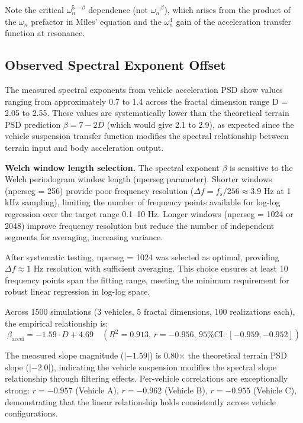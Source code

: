 \documentclass[11pt]{article}
\begin{document}
Note the critical $\omega_n^{5-\beta}$ dependence (not $\omega_n^{-\beta}$), which arises from the product of the $\omega_n$ prefactor in Miles' equation and the $\omega_n^4$ gain of the acceleration transfer function at resonance.


\subsection{Observed Spectral Exponent Offset}

The measured spectral exponents from vehicle acceleration PSD show values ranging from approximately 0.7 to 1.4 across the fractal dimension range D = 2.05 to 2.55. These values are systematically lower than the theoretical terrain PSD prediction $\beta = 7-2D$ (which would give 2.1 to 2.9), as expected since the vehicle suspension transfer function modifies the spectral relationship between terrain input and body acceleration output.

\textbf{Welch window length selection.} The spectral exponent $\beta$ is sensitive to the Welch periodogram window length (nperseg parameter). Shorter windows (nperseg = 256) provide poor frequency resolution ($\Delta f = f_s/256 \approx 3.9$ Hz at 1 kHz sampling), limiting the number of frequency points available for log-log regression over the target range 0.1--10 Hz. Longer windows (nperseg = 1024 or 2048) improve frequency resolution but reduce the number of independent segments for averaging, increasing variance. 

After systematic testing, nperseg = 1024 was selected as optimal, providing $\Delta f \approx 1$ Hz resolution with sufficient averaging. This choice ensures at least 10 frequency points span the fitting range, meeting the minimum requirement for robust linear regression in log-log space.

Across 1500 simulations (3 vehicles, 5 fractal dimensions, 100 realizations each), the empirical relationship is:
\begin{equation}
\beta_{\text{accel}} = -1.59 \cdot D + 4.69 \quad (R^2 = 0.913, \, r = -0.956, \, \text{95\% CI: } [-0.959, -0.952])
\end{equation}

The measured slope magnitude ($|-1.59|$) is 0.80$\times$ the theoretical terrain PSD slope ($|-2.0|$), indicating the vehicle suspension modifies the spectral slope relationship through filtering effects. Per-vehicle correlations are exceptionally strong: $r = -0.957$ (Vehicle A), $r = -0.962$ (Vehicle B), $r = -0.955$ (Vehicle C), demonstrating that the linear relationship holds consistently across vehicle configurations.
\end{document}
